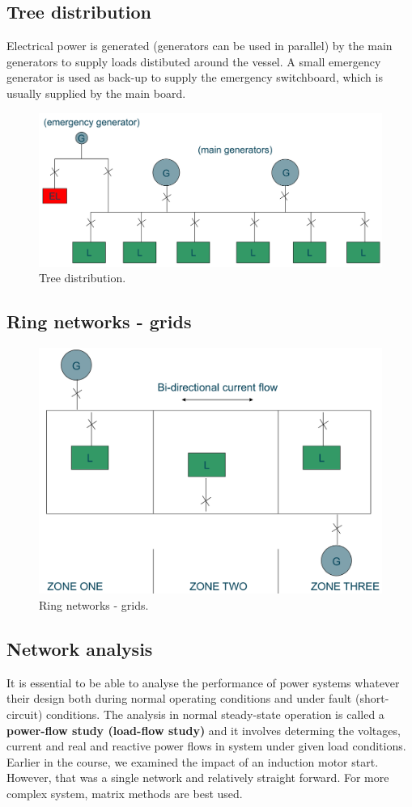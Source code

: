 \subsection{Tree distribution}
Electrical power is generated (generators can be used in parallel) by the main generators to supply loads distibuted around the vessel. A small emergency generator is used as back-up to supply the emergency switchboard, which is usually supplied by the main board. 
\begin{figure}[H]
	\centering
	\includegraphics[width = \textwidth]{./img/figure47.png}
	\caption{Tree distribution.}
\end{figure}
\subsection{Ring networks - grids}
\begin{figure}[H]
	\centering
	\includegraphics[width = \textwidth]{./img/figure48.png}
	\caption{Ring networks - grids.}
\end{figure}
\subsection{Network analysis}
It is essential to be able to analyse the performance of power systems whatever their design both during normal operating conditions and under fault (short-circuit) conditions. The analysis in normal steady-state operation is called a \textbf{power-flow study (load-flow study)} and it involves determing the voltages, current and real and reactive power flows in system under given load conditions. Earlier in the course, we examined the impact of an induction motor start. However, that was a single network and relatively straight forward. For more complex system, matrix methods are best used.

